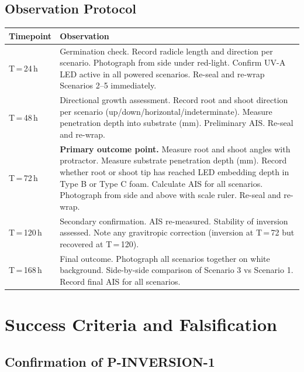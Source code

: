 \documentclass[10pt, a4paper]{article}
\begin{document}
\subsection{Observation Protocol}

\begin{tabular}{p{1.8cm}p{10.0cm}}
\toprule
\textbf{Timepoint} & \textbf{Observation} \\
\midrule
T\,=\,24\,h &
Germination check. Record radicle length and direction
per scenario. Photograph from side under red-light.
Confirm UV-A LED active in all powered scenarios.
Re-seal and re-wrap Scenarios 2--5 immediately. \\[0.3em]
T\,=\,48\,h &
Directional growth assessment.
Record root and shoot direction per scenario
(up/down/horizontal/indeterminate).
Measure penetration depth into substrate (mm).
Preliminary AIS. Re-seal and re-wrap. \\[0.3em]
T\,=\,72\,h &
\textbf{Primary outcome point.}
Measure root and shoot angles with protractor.
Measure substrate penetration depth (mm).
Record whether root or shoot tip has reached
LED embedding depth in Type B or Type C foam.
Calculate AIS for all scenarios.
Photograph from side and above with scale ruler.
Re-seal and re-wrap. \\[0.3em]
T\,=\,120\,h &
Secondary confirmation.
AIS re-measured. Stability of inversion assessed.
Note any gravitropic correction (inversion at T\,=\,72
but recovered at T\,=\,120). \\[0.3em]
T\,=\,168\,h &
Final outcome. Photograph all scenarios together on
white background. Side-by-side comparison of Scenario 3
vs Scenario 1. Record final AIS for all scenarios. \\
\bottomrule
\end{tabular}

\vspace{0.5em}

\section{Success Criteria and Falsification}

\subsection{Confirmation of P-INVERSION-1}
\end{document}
